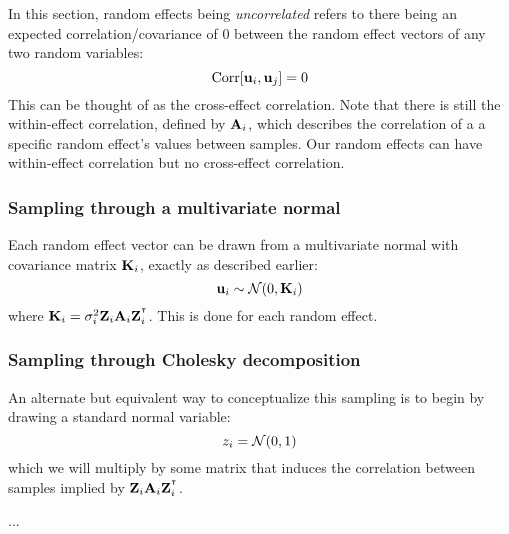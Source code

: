 \documentclass[12pt]{article}
\begin{document}
In this section, random effects being \emph{uncorrelated} refers to there being an expected correlation/covariance of 0 between the random effect vectors of any two random variables:
$$ \mathrm{Corr}[\mathbf{u}_i, \mathbf{u}_j] = 0 $$
This can be thought of as the cross-effect correlation.
Note that there is still the within-effect correlation, defined by $\mathbf{A}_i$, which describes the correlation of a a specific random effect's values between samples.
Our random effects can have within-effect correlation but no cross-effect correlation.

\subsubsection{Sampling through a multivariate normal}
Each random effect vector can be drawn from a multivariate normal with covariance matrix $\mathbf{K}_i$, exactly as described earlier:
$$ \mathbf{u}_i \sim \mathcal{N} (0, \mathbf{K}_i) $$
where $\mathbf{K}_i = \sigma_i^2 \mathbf{Z}_i \mathbf{A}_i \mathbf{Z}_i^{^\intercal} $.
This is done for each random effect.

\subsubsection{Sampling through Cholesky decomposition}
An alternate but equivalent way to conceptualize this sampling is to begin by drawing a standard normal variable:
$$ z_i = \mathcal{N}(0,1) $$
which we will multiply by some matrix that induces the correlation between samples implied by $\mathbf{Z}_i \mathbf{A}_i \mathbf{Z}_i^{^\intercal}$.

...
\end{document}
